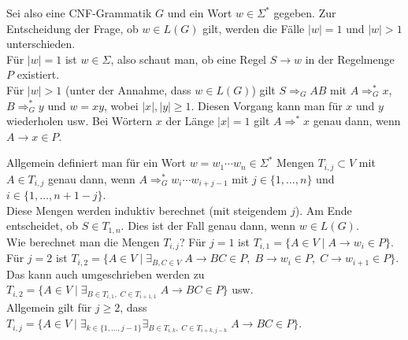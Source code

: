 \begin{Bem}
    Sei also eine CNF-Grammatik $G$ und ein Wort $w \in \Sigma^\ast$ gegeben.
    Zur Entscheidung der Frage, ob $w \in L(G)$ gilt, werden die Fälle
    $|w| = 1$ und $|w| > 1$ unterschieden.\\
    Für $|w| = 1$ ist $w \in \Sigma$, also schaut man, ob eine Regel
    $S \rightarrow w$ in der Regelmenge $P$ existiert.\\
    Für $|w| > 1$ (unter der Annahme, dass $w \in L(G)$)
    gilt $S \Rightarrow_G AB$ mit $A \Rightarrow_G^\ast x$,
    $B \Rightarrow_G^\ast y$ und $w = xy$, wobei $|x|, |y| \ge 1$.
    Diesen Vorgang kann man für $x$ und $y$ wiederholen usw.
    Bei Wörtern $x$ der Länge $|x| = 1$ gilt $A \Rightarrow^\ast x$ genau dann,
    wenn $A \rightarrow x \in P$.

    Allgemein definiert man für ein Wort $w = w_1 \dotsb w_n \in \Sigma^\ast$
    Mengen $T_{i,j} \subset V$ mit $A \in T_{i,j}$ genau dann, wenn
    $A \Rightarrow_G^\ast w_i \dotsb w_{i+j-1}$ mit
    $j \in \{1, \dotsc, n\}$
    und $i \in \{1, \dotsc, n + 1 - j\}$.\\
    Diese Mengen werden induktiv berechnet (mit steigendem $j$).
    Am Ende entscheidet, ob $S \in T_{1,n}$.
    Dies ist der Fall genau dann, wenn $w \in L(G)$.\\
    Wie berechnet man die Mengen $T_{i,j}$?
    Für $j = 1$ ist $T_{i,1} = \{A \in V \;|\; A \rightarrow w_i \in P\}$.
    Für $j = 2$ ist $T_{i,2} = \{A \in V \;|\;
    \exists_{B, C \in V}\; A \rightarrow BC \in P,\; B \rightarrow w_i \in P,\;
    C \rightarrow w_{i+1} \in P\}$.
    Das kann auch umgeschrieben werden zu
    $T_{i,2} = \{A \in V \;|\; \exists_{B \in T_{i,1},\; C \in T_{i+1,1}}\;
    A \rightarrow BC \in P\}$ usw.\\
    Allgemein gilt für $j \ge 2$, dass $T_{i,j} = \{A \in V \;|\;
    \exists_{k \in \{1, \dotsc, j - 1\}}
    \exists_{B \in T_{i,k},\; C \in T_{i+k,j-k}}\; A \rightarrow BC \in P\}$.


\end{Bem}
